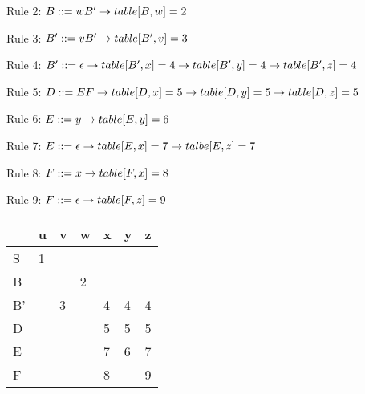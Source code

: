           Rule 2: $B::= wB'\\
            \rightarrow table[B,w] = 2$
            
          Rule 3: $B'::= vB'\\
            \rightarrow table[B',v] = 3$
            
          Rule 4: $B'::= \epsilon\\
            \rightarrow table[B',x] = 4\\
            \rightarrow table[B',y] = 4\\
            \rightarrow table[B',z] = 4$
            
          Rule 5: $D::= EF\\
            \rightarrow table[D,x] = 5\\
            \rightarrow table[D,y] = 5\\
            \rightarrow table[D,z] = 5$
            
          Rule 6: $E::= y\\
            \rightarrow table[E,y] = 6$
            
          Rule 7: $E::= \epsilon\\
            \rightarrow table[E,x] = 7\\
            \rightarrow talbe[E,z] = 7$
            
          Rule 8: $F::= x\\
            \rightarrow table[F,x] = 8$
            
          Rule 9: $F::= \epsilon\\
            \rightarrow table[F,z] = 9$
            
            \begin{tabular}{ p{2cm} | p{2cm} | p{2cm} | p{2cm} | p{2cm} | p{2cm} | p{2cm}}
                \hline
                & u & v & w & x & y & z \\ \hline                        
                S & 1 & & & & & \\ \hline
                B & & & 2 & & & \\ \hline
                B' & & 3 & & 4 & 4 & 4 \\ \hline
                D & & & & 5 & 5 & 5 \\ \hline
                E & & & & 7 & 6 & 7 \\ \hline
                F & & & & 8 & & 9 \\
                \hline
            \end{tabular}
  

